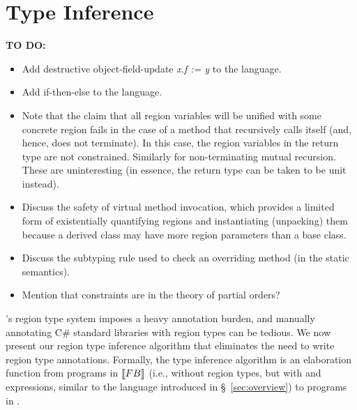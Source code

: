 \section{Type Inference}
\label{sec:type-inference}

\textbf{TO DO:}
\begin{itemize}
\item Add destructive object-field-update \emph{x.f := y} to the language.
\item Add if-then-else to the language.
\item Note that the claim that all region variables will be unified with some concrete
region fails in the case of a method that recursively calls itself (and, hence, does not
terminate). In this case, the region variables in the return type are not constrained.
Similarly for non-terminating mutual recursion. These are uninteresting (in essence, the
return type can be taken to be unit instead).
\item Discuss the safety of virtual method invocation, which provides a limited form
of existentially quantifying regions and instantiating (unpacking) them because a
derived class may have more region parameters than a base class.
\item Discuss the subtyping rule used to check an overriding method (in the static
semantics).
\item Mention that constraints are in the theory of partial orders?
\end{itemize}

\name's region type system imposes a heavy annotation burden, and
manually annotating C\# standard libraries with region types
can be tedious. We now present our region type inference algorithm
that eliminates the need to write region type annotations.
Formally, the type inference
algorithm is an elaboration function from programs in $\llbracket {\sc FB} \rrbracket$
(i.e., \FB without region types, but with  and 
expressions, similar to the language introduced in
\S~\ref{sec:overview}) to programs in \FB.

